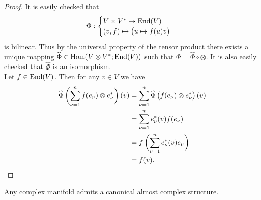 \begin{proof}
It is easily checked that
\begin{equation*}
\Phi:\begin{cases} 
V \times V^* \to \End(V)\\
(v,f) \mapsto \del[1]{u \mapsto f(u)v}
\end{cases}
\end{equation*}
\noindent is bilinear. Thus by the universal property of the tensor product there exists a unique mapping $\widehat{\Phi} \in \operatorname{Hom}(V \otimes V^*; \operatorname{End}(V))$ such that $\Phi = \widehat{\Phi} \circ \otimes$. It is also easily checked that $\widehat{\Phi}$ is an isomorphism.\\
Let $f \in \operatorname{End}(V)$. Then for any $v \in V$ we have
\begin{align*}
\widehat{\Phi}\del[3]{\sum_{\nu = 1}^n f(e_\nu) \otimes e_\nu^*}(v) &= \sum_{\nu = 1}^n \widehat{\Phi}\del[1]{f(e_\nu) \otimes e_\nu^*}(v)\\
&= \sum_{\nu = 1}^n e_\nu^*(v)f(e_\nu)\\
&= f\del[3]{\sum_{\nu = 1}^n e_\nu^*(v)e_\nu}\\
&= f(v).
\end{align*}
\end{proof}

\begin{proposition}
Any complex manifold admits a canonical almost complex structure.
\label{prop:complex_is_almost}
\end{proposition}

